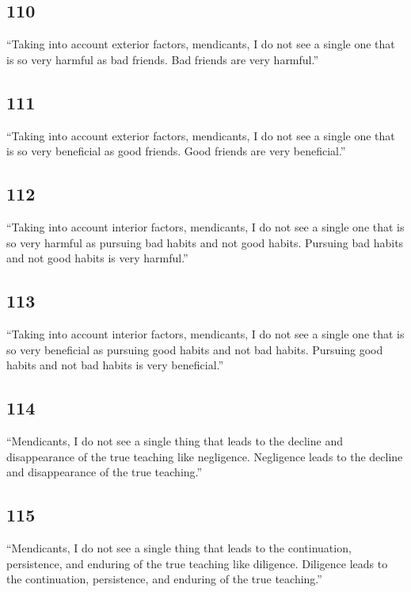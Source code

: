 \documentclass[12pt,openany]{book}%
\begin{document}
\subsection*{110 }

“Taking into account exterior factors, mendicants, I do not see a single one that is so very harmful as bad friends. Bad friends are very harmful.” 

\subsection*{111 }

“Taking into account exterior factors, mendicants, I do not see a single one that is so very beneficial as good friends. Good friends are very beneficial.” 

\subsection*{112 }

“Taking into account interior factors, mendicants, I do not see a single one that is so very harmful as pursuing bad habits and not good habits. Pursuing bad habits and not good habits is very harmful.” 

\subsection*{113 }

“Taking into account interior factors, mendicants, I do not see a single one that is so very beneficial as pursuing good habits and not bad habits. Pursuing good habits and not bad habits is very beneficial.” 

\subsection*{114 }

“Mendicants, I do not see a single thing that leads to the decline and disappearance of the true teaching like negligence. Negligence leads to the decline and disappearance of the true teaching.” 

\subsection*{115 }

“Mendicants, I do not see a single thing that leads to the continuation, persistence, and enduring of the true teaching like diligence. Diligence leads to the continuation, persistence, and enduring of the true teaching.” 
\end{document}
